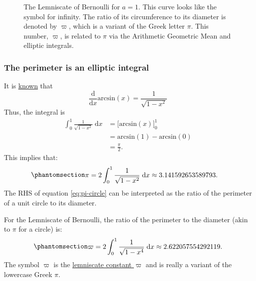 \documentclass[
  a4paper,
]{article}
\begin{document}
\begin{figure}
\centering

\caption{The Lemniscate of Bernoulli for \(a = 1\). This curve looks
like the symbol for infinity. The ratio of its circumference to its
diameter is denoted by \(\varpi\), which is a variant of the Greek
letter \(\pi\). This number, \(\varpi\), is related to \(\pi\) via the
Arithmetic Geometric Mean and elliptic integrals.}\label{fig:lemniscate}
\end{figure}

\subsubsection{The perimeter is an elliptic
integral}\label{the-perimeter-is-an-elliptic-integral}

It is
\href{https://ocw.mit.edu/courses/18-01sc-single-variable-calculus-fall-2010/857933bc947b1ed184c79a5710fc86bc_MIT18_01SCF10_Ses15c.pdf}{known}
that \[
\frac{\mathrm{d}}{\mathrm{d}x} \mathrm{​arcsin}(x) = \frac{1}{\sqrt{1 - x^2}}
\] Thus, the integral is \[
\begin{aligned}
\int_0^1 \frac{1}{\sqrt{1 - x^2}}\;\mathrm{d}x &= \bigl[\mathrm{arcsin}(x)\bigr]_0^1\\
&= \mathrm{arcsin}(1) - \mathrm{arcsin}(0)\\
&= \frac{\pi}{2}.
\end{aligned}
\] This implies that:
\begin{equation}\phantomsection\label{eq:pi-circle}{
\begin{aligned}
\pi &= 2\int_0^1 \frac{1}{\sqrt{1 - x^2}}\;\mathrm{d}x \approx 3.141592653589793.
\end{aligned}
}\end{equation} The RHS of equation \cref{eq:pi-circle} can be
interpreted as the ratio of the perimeter of a unit circle to its
diameter.

For the Lemniscate of Bernoulli, the ratio of the perimeter to the
diameter (akin to \(\pi\) for a circle) is:
\begin{equation}\phantomsection\label{eq:varpi-lemniscate}{
\begin{aligned}
\varpi = 2\int_0^1 \frac{1}{\sqrt{1 - x^4}}\;\mathrm{d}x \approx 2.622057554292119.
\end{aligned}
}\end{equation} The symbol \(\varpi\) is the
\href{https://en.wikipedia.org/wiki/Lemniscate_constant}{lemniscate
constant \(\varpi\)} and is really a variant of the lowercase Greek
\(\pi\).
\end{document}
